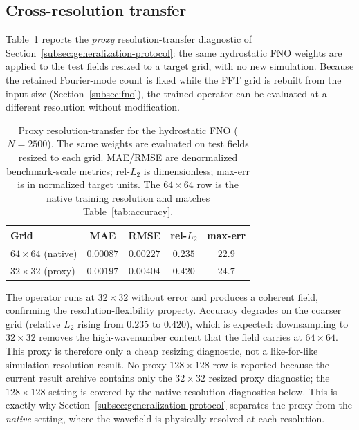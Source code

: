 \subsection{Cross-resolution transfer}
\label{subsec:res-crossres}

Table~\ref{tab:crossres} reports the \emph{proxy} resolution-transfer diagnostic of Section~\ref{subsec:generalization-protocol}: the same hydrostatic FNO weights are applied to the test fields resized to a target grid, with no new simulation. Because the retained Fourier-mode count is fixed while the FFT grid is rebuilt from the input size (Section~\ref{subsec:fno}), the trained operator can be evaluated at a different resolution without modification.

\begin{table}[!htbp]
\centering
\caption{Proxy resolution-transfer for the hydrostatic FNO ($N=2500$). The same weights are evaluated on test fields resized to each grid. MAE/RMSE are denormalized benchmark-scale metrics; rel-$L_2$ is dimensionless; max-err is in normalized target units. The $64 \times 64$ row is the native training resolution and matches Table~\ref{tab:accuracy}.}
\label{tab:crossres}
\begin{tabular}{lcccc}
    \toprule
    Grid & MAE & RMSE & rel-$L_2$ & max-err \\
    \midrule
    $64\times64$ (native) & $0.00087$ & $0.00227$ & $0.235$ & $22.9$ \\
    $32\times32$ (proxy)  & $0.00197$ & $0.00404$ & $0.420$ & $24.7$ \\
    \bottomrule
\end{tabular}
\end{table}

The operator runs at $32 \times 32$ without error and produces a coherent field, confirming the resolution-flexibility property. Accuracy degrades on the coarser grid (relative $L_2$ rising from $0.235$ to $0.420$), which is expected: downsampling to $32 \times 32$ removes the high-wavenumber content that the field carries at $64 \times 64$. This proxy is therefore only a cheap resizing diagnostic, not a like-for-like simulation-resolution result. No proxy $128 \times 128$ row is reported because the current result archive contains only the $32 \times 32$ resized proxy diagnostic; the $128 \times 128$ setting is covered by the native-resolution diagnostics below. This is exactly why Section~\ref{subsec:generalization-protocol} separates the proxy from the \emph{native} setting, where the wavefield is physically resolved at each resolution.


